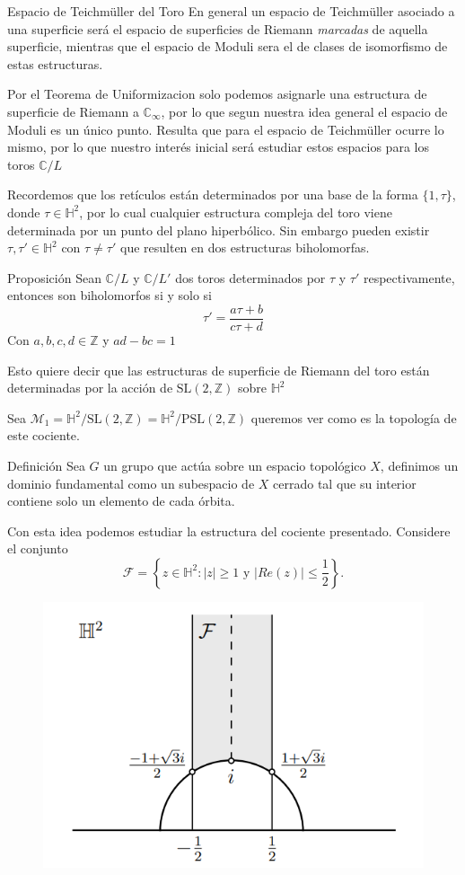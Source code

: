 \documentclass[xcolor=dvipsnames,10pt]{beamer}
\newcommand\Z{\ensuremath{\mathbb{Z}}}
\newcommand\C{\ensuremath{\mathbb{C}}}
\newcommand\Hs{\ensuremath{\mathbb{H}}}
\begin{document}
\begin{frame}{Espacio de Teichmüller del Toro}
    En general un espacio de Teichmüller asociado a una superficie será el espacio de superficies de Riemann \textit{marcadas} de aquella superficie, mientras que el espacio de Moduli sera el de clases de isomorfismo de estas estructuras.\\
    \vspace{0.5cm}

    Por el Teorema de Uniformizacion solo podemos asignarle una estructura de superficie de Riemann a $\C_\infty$, por lo que segun nuestra idea general el espacio de Moduli es un único punto. Resulta que para el espacio de Teichmüller ocurre lo mismo, por lo que nuestro interés inicial será estudiar estos espacios para los toros $\C/L$
\end{frame}
\begin{frame}
    Recordemos que los retículos están determinados por una base de la forma $\{1,\tau\}$, donde $\tau\in \Hs^2$, por lo cual cualquier estructura compleja del toro viene determinada por un punto del plano hiperbólico. Sin embargo pueden existir $\tau, \tau' \in \Hs^2$ con $\tau \neq \tau'$ que resulten en dos estructuras biholomorfas.

    \begin{block}{Proposición}
        Sean $\C/L$ y $\C/L'$ dos toros determinados por $\tau$ y $\tau'$ respectivamente, entonces son biholomorfos si y solo si
        \[
            \tau' = \frac{a\tau + b}{c\tau + d}
        \]
        Con $a,b,c,d \in \Z$ y $ad-bc=1$
    \end{block}

    Esto quiere decir que las estructuras de superficie de Riemann del toro están determinadas por la acción de $\text{SL}(2,\Z)$ sobre $\Hs^2$
\end{frame}
\begin{frame}
    Sea $\mathcal{M}_1 = \Hs^2/\text{SL}(2,\Z) = \Hs^2/\text{PSL}(2,\Z)$ queremos ver como es la topología de este cociente. 
    \begin{block}{Definición}
        Sea $G$ un grupo que actúa sobre un espacio topológico $X$, definimos un dominio fundamental como un subespacio de $X$ cerrado tal que su interior contiene solo un elemento de cada órbita.
    \end{block}
    Con esta idea podemos estudiar la estructura del cociente presentado. Considere el conjunto 
    $$\mathcal{F}=\left\{z\in\Hs^2:|z|\geq 1\text{ y } |Re(z)|\leq \frac{1}{2}\right\}.$$
    \begin{figure}
            \centering
            \includegraphics[width=0.4\linewidth]{Imagenes/FunDom.png}
        \end{figure} 
    
\end{frame}
\end{document}
